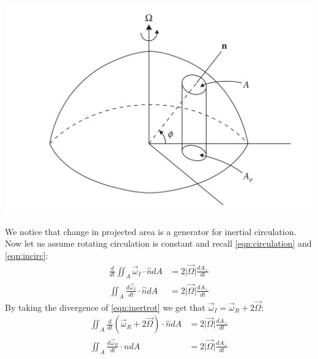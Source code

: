 \begin{minipage}{0.49\textwidth}
    \vspace{-2ex}
    \begin{center}
        \includegraphics[width=\linewidth]{assets/circulation.png}
        \label{fig:circulation}
    \end{center}
\end{minipage}\hspace{0.05\textwidth}
\begin{minipage}{0.49\textwidth}
    We notice that change in projected area is a generator for inertial circulation. Now let us assume rotating circulation is constant and recall \ref{eqn:circulation} and \ref{eqn:incirc}:
    \begin{align*}
        \frac{d}{dt}\iint_A \Vec{\omega}_I\cdot\hat{n}dA &=  2\vert \Vec{\Omega}\vert \frac{dA_\perp}{dt}\\
        \iint_A \frac{d\Vec{\omega}_I}{dt}\cdot\hat{n}dA &= 2\vert \Vec{\Omega}\vert \frac{dA_\perp}{dt}
    \end{align*}
    By taking the divergence of \ref{eqn:inertrot} we get that $\Vec{\omega}_I=\Vec{\omega}_R+2\vec{\Omega}$:
    \begin{align*}
        \iint_A \frac{d}{dt}\left(\Vec{\omega}_R+2\Vec{\Omega}\right)\cdot\hat{n}dA &= 2\vert \Vec{\Omega}\vert \frac{dA_\perp}{dt}\\
        \iint_A \frac{d\vec{\omega}_R}{dt}\cdot\hat{n}dA &= 2\vert \Vec{\Omega}\vert \frac{dA_\perp}{dt}
    \end{align*}
    \vspace{1cm}
\end{minipage}
